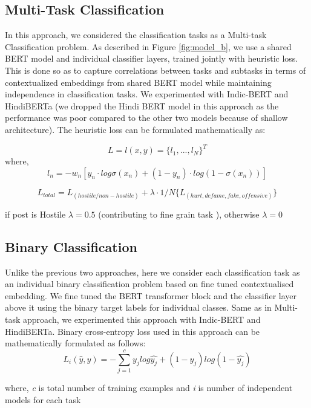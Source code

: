 \documentclass[runningheads]{llncs}
\begin{document}
\subsection{Multi-Task Classification}
{In this approach, we considered the classification tasks as a Multi-task Classification problem. As described in Figure \ref{fig:model_b}, we use a shared BERT model and individual classifier layers, trained jointly with heuristic loss. This is done so as to capture correlations between tasks and subtasks in terms of contextualized embeddings from shared BERT model while maintaining independence in classification tasks. We experimented with Indic-BERT and HindiBERTa (we dropped the Hindi BERT model in this approach as the performance was poor compared to the other two models because of shallow architecture). The heuristic loss can be formulated mathematically as:

\[ L = l(x, y)  = { \{ l_1, ..., l_N\}}^T\]
where,  \[l_n = -w_n [y_n \cdot log\sigma(x_n) + (1- y_n) \cdot log(1- \sigma(x_n))]\]

\[L_{total} =  L_{(hostile/non-hostile)}+ \lambda \cdot 1/N \{L_{(hurt, defame, fake, offensive)}\}\]

if  post is Hostile \(\lambda = 0.5  \) (contributing to fine grain task ),  otherwise \(\lambda = 0\)
}

\subsection{Binary Classification}
{Unlike the previous two approaches, here we consider each classification task as an individual binary classification problem based on fine tuned contextualised embedding. We fine tuned the BERT transformer block and the classifier layer above it using the binary target labels for individual classes. Same as in Multi-task approach, we experimented this approach with Indic-BERT and HindiBERTa. Binary cross-entropy loss used in this approach can be mathematically formulated as follows:
\[L_{i}(\hat{y},y) = - \sum_{j=1}^{c}y_{j}log\hat{y_j} + (1 - y_j)log(1-\hat{y_j})\] 


where, \textit{c} is total number of training examples and \textit{i} is number of independent models for each task
}
\end{document}
